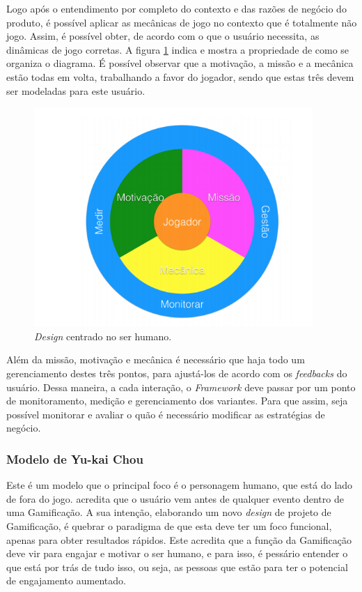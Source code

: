 Logo após o entendimento por completo do contexto e das razões de negócio do
produto, é possível aplicar as mecânicas de jogo no contexto que é totalmente
não jogo. Assim, é possível obter, de acordo com o que o usuário necessita, as
dinâmicas de jogo corretas. A figura \ref{fig:Kumar} indica e mostra a propriedade de
como se organiza o diagrama. É possível observar que a motivação, a missão e a
mecânica estão todas em volta, trabalhando a favor do jogador, sendo que estas
três devem ser modeladas para este usuário.

\begin{figure}[h]
    \centering
    \includegraphics[width=400px, scale=1]{figuras/kumar}
    \caption{ \textit{Design} centrado no ser humano.}
    \label{fig:Kumar}
\end{figure}

Além da missão, motivação e mecânica é necessário que haja todo um gerenciamento
destes três pontos, para ajustá-los de acordo com os \textit{feedbacks} do usuário. Dessa
maneira, a cada interação, o \textit{Framework} deve passar por um ponto de monitoramento,
medição e gerenciamento dos variantes. Para que assim, seja possível monitorar e
avaliar o quão é necessário modificar as estratégias de negócio.

\subsubsection{Modelo de Yu-kai Chou}
\label{sub:modelodeyu-kaichou}
Este é um modelo que o principal foco é o personagem humano, que está do lado
de fora do jogo. \cite{chou2015actionable} acredita que o usuário vem antes de qualquer evento
dentro de uma Gamificação. A sua intenção, elaborando um novo \textit{design} de projeto
de Gamificação, é quebrar o paradigma de que esta deve ter um foco funcional,
apenas para obter resultados rápidos. Este acredita que a função da Gamificação
deve vir para engajar e motivar o ser humano, e para isso, é pessário entender o
que está por trás de tudo isso, ou seja, as pessoas que estão para ter o
potencial de engajamento aumentado.

